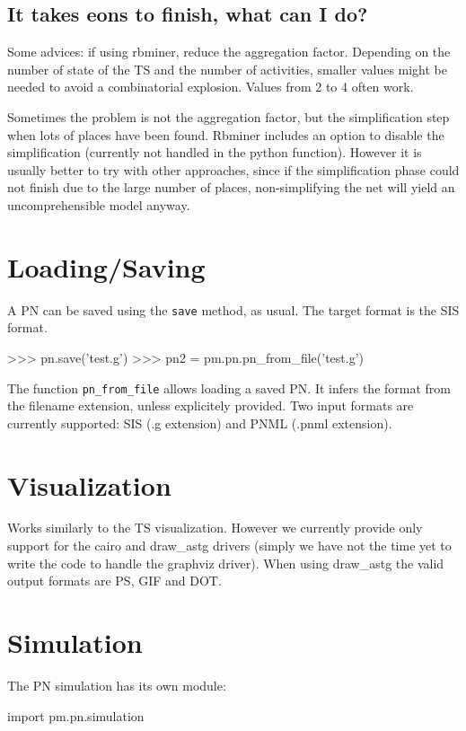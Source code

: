 \documentclass[a4paper,10pt]{book}
\begin{document}
\subsection{It takes eons to finish, what can I do?}
Some advices: if using rbminer, reduce the aggregation factor. Depending on the number of state of the TS and the number of activities, smaller values might be needed to avoid a combinatorial explosion. Values from 2 to 4 often work. 

Sometimes the problem is not the aggregation factor, but the simplification step when lots of places have been found. Rbminer includes an option to disable the simplification (currently not handled in the python function). However it is usually better to try with other approaches, since if the simplification phase could not finish due to the large number of places, non-simplifying the net will yield an uncomprehensible model anyway.

\section{Loading/Saving}
A PN can be saved using the \texttt{save} method, as usual. The target format is the SIS format.\\

\begin{pycode}
>>> pn.save('test.g')
>>> pn2 = pm.pn.pn_from_file('test.g')
\end{pycode}

The function \texttt{pn\_from\_file} allows loading a saved PN. It infers the format from the filename extension, unless explicitely provided. Two input formats are currently supported: SIS (.g extension) and PNML (.pnml extension).

\section{Visualization}
Works similarly to the TS visualization. However we currently provide only support for the cairo and draw\_astg drivers (simply we have not the time yet to write the code to handle the graphviz driver). When using draw\_astg the valid output formats are PS, GIF and DOT.

\section{Simulation}
The PN simulation has its own module:\\
\begin{pycode}
import pm.pn.simulation
\end{pycode}
\end{document}
